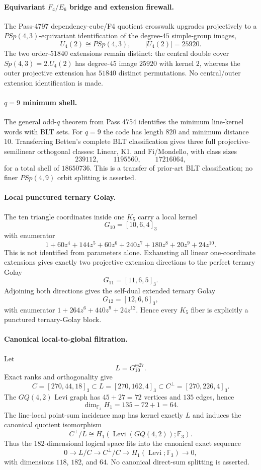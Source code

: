 \paragraph{Equivariant $F_4/E_6$ bridge and extension firewall.}
The Pass-4797 dependency-cube/F4 quotient crosswalk upgrades projectively to a $PSp(4,3)$-equivariant identification of the degree-$45$ simple-group images,
\[
U_4(2)\cong PSp(4,3),\qquad |U_4(2)|=25920.
\]
The two order-$51840$ extensions remain distinct: the central double cover $Sp(4,3)=2.U_4(2)$ has degree-$45$ image $25920$ with kernel $2$, whereas the outer projective extension has $51840$ distinct permutations.  No central/outer extension identification is made.

\paragraph{$q=9$ minimum shell.}
The general odd-$q$ theorem from Pass 4754 identifies the minimum line-kernel words with BLT sets.  For $q=9$ the code has length $820$ and minimum distance $10$.  Transferring Betten's complete BLT classification gives three full projective-semilinear orthogonal classes: Linear, K1, and Fi/Mondello, with class sizes
\[
239112,\qquad1195560,\qquad17216064,
\]
for a total shell of $18650736$.  This is a transfer of prior-art BLT classification; no finer $PSp(4,9)$ orbit splitting is asserted.

\paragraph{Local punctured ternary Golay.}
The ten triangle coordinates inside one $K_5$ carry a local kernel
\[
G_{10}=[10,6,4]_3
\]
with enumerator
\[
1+60z^4+144z^5+60z^6+240z^7+180z^8+20z^9+24z^{10}.
\]
This is not identified from parameters alone.  Exhausting all linear one-coordinate extensions gives exactly two projective extension directions to the perfect ternary Golay
\[
G_{11}=[11,6,5]_3.
\]
Adjoining both directions gives the self-dual extended ternary Golay
\[
G_{12}=[12,6,6]_3,
\]
with enumerator $1+264z^6+440z^9+24z^{12}$.  Hence every $K_5$ fiber is explicitly a punctured ternary-Golay block.

\paragraph{Canonical local-to-global filtration.}
Let
\[
L=G_{10}^{\oplus27}.
\]
Exact ranks and orthogonality give
\[
C=[270,44,18]_3\subset L=[270,162,4]_3\subset C^\perp=[270,226,4]_3.
\]
The $GQ(4,2)$ Levi graph has $45+27=72$ vertices and $135$ edges, hence
\[
\dim_{\mathbb F_3}H_1=135-72+1=64.
\]
The line-local point-sum incidence map has kernel exactly $L$ and induces the canonical quotient isomorphism
\[
\boxed{C^\perp/L\cong H_1(\operatorname{Levi}(GQ(4,2));\mathbb F_3).}
\]
Thus the $182$-dimensional logical space fits into the canonical exact sequence
\[
0\longrightarrow L/C\longrightarrow C^\perp/C\longrightarrow H_1(\operatorname{Levi};\mathbb F_3)\longrightarrow0,
\]
with dimensions $118$, $182$, and $64$.  No canonical direct-sum splitting is asserted.

